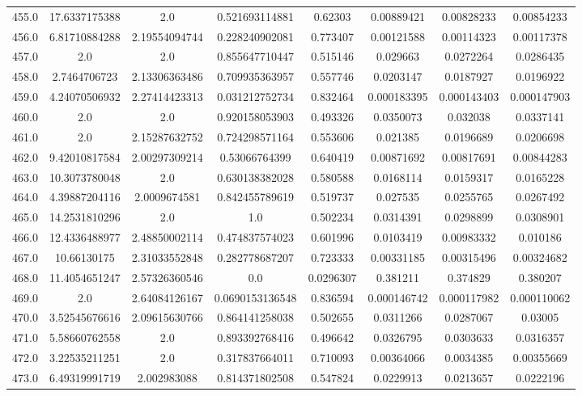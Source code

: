 \begin{longtable}{|c|c|c|c|c|c|c|c|}
455.0 & 17.6337175388 & 2.0 & 0.521693114881 & 0.62303 & 0.00889421 & 0.00828233 & 0.00854233 \\
456.0 & 6.81710884288 & 2.19554094744 & 0.228240902081 & 0.773407 & 0.00121588 & 0.00114323 & 0.00117378 \\
457.0 & 2.0 & 2.0 & 0.855647710447 & 0.515146 & 0.029663 & 0.0272264 & 0.0286435 \\
458.0 & 2.7464706723 & 2.13306363486 & 0.709935363957 & 0.557746 & 0.0203147 & 0.0187927 & 0.0196922 \\
459.0 & 4.24070506932 & 2.27414423313 & 0.031212752734 & 0.832464 & 0.000183395 & 0.000143403 & 0.000147903 \\
460.0 & 2.0 & 2.0 & 0.920158053903 & 0.493326 & 0.0350073 & 0.032038 & 0.0337141 \\
461.0 & 2.0 & 2.15287632752 & 0.724298571164 & 0.553606 & 0.021385 & 0.0196689 & 0.0206698 \\
462.0 & 9.42010817584 & 2.00297309214 & 0.53066764399 & 0.640419 & 0.00871692 & 0.00817691 & 0.00844283 \\
463.0 & 10.3073780048 & 2.0 & 0.630138382028 & 0.580588 & 0.0168114 & 0.0159317 & 0.0165228 \\
464.0 & 4.39887204116 & 2.0009674581 & 0.842455789619 & 0.519737 & 0.027535 & 0.0255765 & 0.0267492 \\
465.0 & 14.2531810296 & 2.0 & 1.0 & 0.502234 & 0.0314391 & 0.0298899 & 0.0308901 \\
466.0 & 12.4336488977 & 2.48850002114 & 0.474837574023 & 0.601996 & 0.0103419 & 0.00983332 & 0.010186 \\
467.0 & 10.66130175 & 2.31033552848 & 0.282778687207 & 0.723333 & 0.00331185 & 0.00315496 & 0.00324682 \\
468.0 & 11.4054651247 & 2.57326360546 & 0.0 & 0.0296307 & 0.381211 & 0.374829 & 0.380207 \\
469.0 & 2.0 & 2.64084126167 & 0.0690153136548 & 0.836594 & 0.000146742 & 0.000117982 & 0.000110062 \\
470.0 & 3.52545676616 & 2.09615630766 & 0.864141258038 & 0.502655 & 0.0311266 & 0.0287067 & 0.03005 \\
471.0 & 5.58660762558 & 2.0 & 0.893392768416 & 0.496642 & 0.0326795 & 0.0303633 & 0.0316357 \\
472.0 & 3.22535211251 & 2.0 & 0.317837664011 & 0.710093 & 0.00364066 & 0.0034385 & 0.00355669 \\
473.0 & 6.49319991719 & 2.002983088 & 0.814371802508 & 0.547824 & 0.0229913 & 0.0213657 & 0.0222196 \\

\end{longtable}
